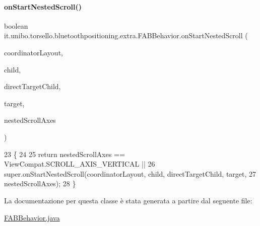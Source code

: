 \paragraph{\texorpdfstring{on\+Start\+Nested\+Scroll()}{onStartNestedScroll()}}
{\footnotesize\ttfamily boolean it.\+unibo.\+torsello.\+bluetoothpositioning.\+extra.\+F\+A\+B\+Behavior.\+on\+Start\+Nested\+Scroll (\begin{DoxyParamCaption}\item[{Coordinator\+Layout}]{coordinator\+Layout,  }\item[{final Floating\+Action\+Button}]{child,  }\item[{View}]{direct\+Target\+Child,  }\item[{View}]{target,  }\item[{int}]{nested\+Scroll\+Axes }\end{DoxyParamCaption})}


\begin{DoxyCode}
23                                                                                                   \{
24 
25         \textcolor{keywordflow}{return} nestedScrollAxes == ViewCompat.SCROLL\_AXIS\_VERTICAL ||
26                 super.onStartNestedScroll(coordinatorLayout, child, directTargetChild, target,
27                         nestedScrollAxes);
28     \}
\end{DoxyCode}


La documentazione per questa classe è stata generata a partire dal seguente file\+:\begin{DoxyCompactItemize}
\item 
\hyperlink{FABBehavior_8java}{F\+A\+B\+Behavior.\+java}\end{DoxyCompactItemize}
